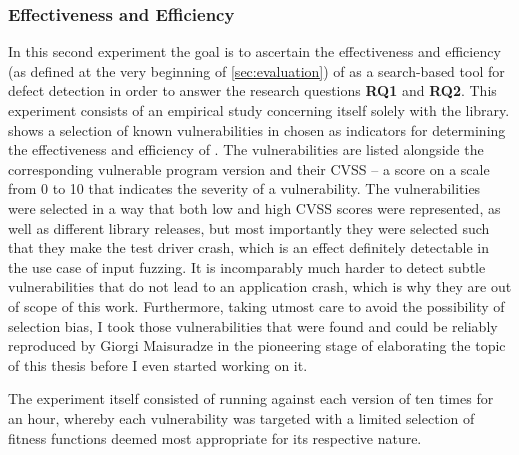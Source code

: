 \subsubsection{Effectiveness and Efficiency}
In this second experiment the goal is to ascertain the effectiveness and efficiency (as defined at the very
beginning of \cref{sec:evaluation}) of \xmlmate as a search-based tool for defect detection in order to answer
the research questions \textbf{RQ1} and \textbf{RQ2}. This experiment consists of
an empirical study concerning itself solely with the \libpng library.  shows a selection of known vulnerabilities in \libpng
chosen as indicators for determining the effectiveness and efficiency of \xmlmate. The vulnerabilities are
listed alongside the corresponding vulnerable program version and their CVSS -- a score on a scale from 0 to 10
that indicates the severity of a vulnerability.
The vulnerabilities were selected in a way that both low and high CVSS scores were represented, as well as
different library releases, but most importantly they were selected such that they make the test driver crash,
which is an effect definitely detectable in the use case of input fuzzing. It is incomparably much harder
to detect subtle vulnerabilities that do not lead to an application crash, which is why they are out of scope of
this work. Furthermore, taking utmost care to avoid the possibility of selection bias, I took those
vulnerabilities that were found and could be reliably reproduced by Giorgi Maisuradze in the pioneering stage
of elaborating the topic of this thesis before I even started working on it.

The experiment itself consisted of running \xmlmate against each version of \libpng ten times for an hour,
whereby each vulnerability was targeted with a limited selection of fitness functions deemed most appropriate
for its respective nature.

